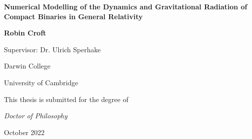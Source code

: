\documentclass[11pt]{report}  %
\numberwithin{equation}{section}
\begin{document}
\begin{titlepage}
  \centering

  \centering
  
  {\huge\bfseries Numerical Modelling of the Dynamics and Gravitational Radiation of Compact Binaries in General Relativity\par} \vspace{0.3cm}
 

\vfill

    \begin{figure}[h!]
  \centering
\end{figure}


  \vfill
   {\Large
   {\bfseries \LARGE Robin Croft}\vspace{0.2cm}

  Supervisor: Dr. Ulrich Sperhake
  \vspace{-0.2cm}

  Darwin College

  University of Cambridge}
\vfill {\Large
This thesis is submitted for the degree of 

{\it Doctor of Philosophy}}
  \vfill

  {\Large October 2022}



\end{titlepage}           %










\vspace{2cm}
\end{document}
